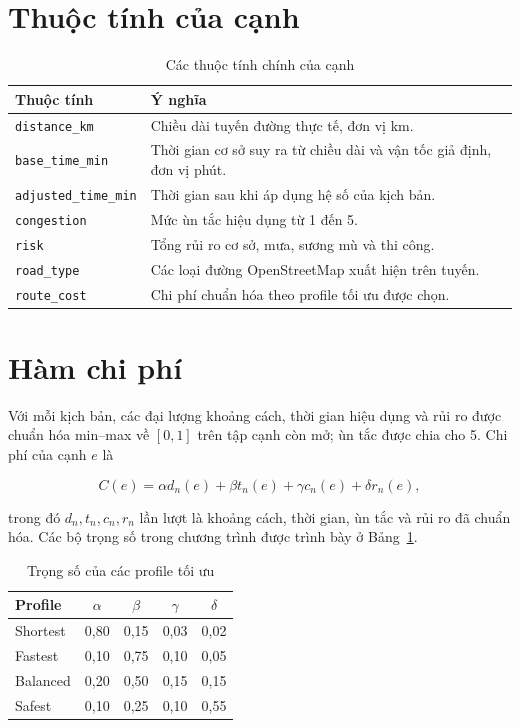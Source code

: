 \section{Thuộc tính của cạnh}
\label{sec:edge-attributes}

\begin{table}[h!]
\centering
\caption{Các thuộc tính chính của cạnh}
\begin{tabular}{p{4.0cm}p{9.2cm}}
\toprule
Thuộc tính & Ý nghĩa \\
\midrule
\texttt{distance\_km} & Chiều dài tuyến đường thực tế, đơn vị km. \\
\texttt{base\_time\_min} & Thời gian cơ sở suy ra từ chiều dài và vận tốc giả định, đơn vị phút. \\
\texttt{adjusted\_time\_min} & Thời gian sau khi áp dụng hệ số của kịch bản. \\
\texttt{congestion} & Mức ùn tắc hiệu dụng từ 1 đến 5. \\
\texttt{risk} & Tổng rủi ro cơ sở, mưa, sương mù và thi công. \\
\texttt{road\_type} & Các loại đường OpenStreetMap xuất hiện trên tuyến. \\
\texttt{route\_cost} & Chi phí chuẩn hóa theo profile tối ưu được chọn. \\
\bottomrule
\end{tabular}
\end{table}

\section{Hàm chi phí}

Với mỗi kịch bản, các đại lượng khoảng cách, thời gian hiệu dụng và rủi ro được
chuẩn hóa min--max về $[0,1]$ trên tập cạnh còn mở; ùn tắc được chia cho 5.
Chi phí của cạnh $e$ là

\begin{equation}
C(e)=\alpha d_n(e)+\beta t_n(e)+\gamma c_n(e)+\delta r_n(e),
\end{equation}

trong đó $d_n,t_n,c_n,r_n$ lần lượt là khoảng cách, thời gian, ùn tắc và rủi
ro đã chuẩn hóa. Các bộ trọng số trong chương trình được trình bày ở
Bảng~\ref{tab:optimization-profiles}.

\begin{table}[h!]
\centering
\caption{Trọng số của các profile tối ưu}
\label{tab:optimization-profiles}
\begin{tabular}{lcccc}
\toprule
Profile & $\alpha$ & $\beta$ & $\gamma$ & $\delta$ \\
\midrule
Shortest & 0,80 & 0,15 & 0,03 & 0,02 \\
Fastest & 0,10 & 0,75 & 0,10 & 0,05 \\
Balanced & 0,20 & 0,50 & 0,15 & 0,15 \\
Safest & 0,10 & 0,25 & 0,10 & 0,55 \\
\bottomrule
\end{tabular}
\end{table}

